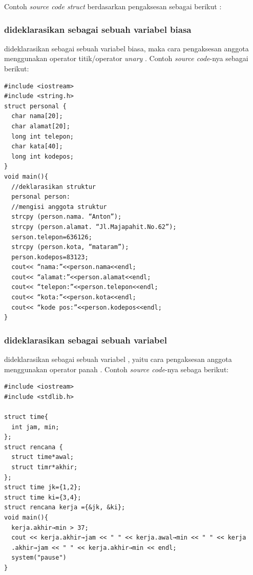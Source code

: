 \documentclass[../main.tex]{subfiles}
\begin{document}
Contoh \textit{source code struct} berdasarkan pengaksesan sebagai berikut \parencite{munir2016algoritma}:

\subsubsection{{\Struct} dideklarasikan sebagai sebuah variabel biasa}

\begin{indentpar}\hpar{}
    {\Struct} dideklarasikan sebagai sebuah variabel biasa, maka cara pengaksesan anggota {\struct} menggunakan operator titik/operator \textit{unary} . Contoh \textit{source code}-nya sebagai berikut:
\end{indentpar}

\begin{code}[n]
\begin{verbatim}
#include <iostream>
#include <string.h>
struct personal {
  char nama[20];
  char alamat[20];
  long int telepon;
  char kata[40];
  long int kodepos;
}
void main(){
  //deklarasikan struktur
  personal person:
  //mengisi anggota struktur
  strcpy (person.nama. “Anton”);
  strcpy (person.alamat. “Jl.Majapahit.No.62”);
  serson.telepon=636126;
  strcpy (person.kota, “mataram”);
  person.kodepos=83123;
  cout<< “nama:”<<person.nama<<endl;
  cout<< “alamat:”<<person.alamat<<endl;
  cout<< “telepon:”<<person.telepon<<endl;
  cout<< “kota:”<<person.kota<<endl;
  cout<< “kode pos:”<<person.kodepos<<endl;
}
\end{verbatim}
\end{code}

\subsubsection{{\Struct} dideklarasikan sebagai sebuah variabel {\pointer}}

\begin{indentpar}\hpar{}
    {\Struct} dideklarasikan sebagai sebuah variabel {\pointer}, yaitu cara pengaksesan anggota {\struct} menggunakan operator panah . Contoh \textit{source code}-nya sebaga berikut:
\end{indentpar}

\begin{code}[n]
\begin{verbatim}
#include <iostream>
#include <stdlib.h>

struct time{
  int jam, min;
};
struct rencana {
  struct time*awal;
  struct timr*akhir;
};
struct time jk={1,2};
struct time ki={3,4};
struct rencana kerja ={&jk, &ki};
void main(){
  kerja.akhir→min > 37;
  cout << kerja.akhir→jam << " " << kerja.awal→min << " " << kerja
  .akhir→jam << " " << kerja.akhir→min << endl;
  system("pause")
}
\end{verbatim}
\end{code}
\vspace{-1ex}
\end{document}
